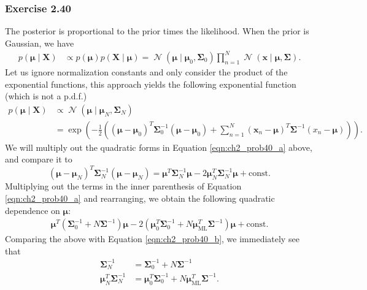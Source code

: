 \documentclass[12pt, a4paper]{article}
\newcommand{\vect}[1]{\bm{#1}}
\DeclareMathOperator{\N}{\mathcal{N}}
\begin{document}
\subsubsection*{Exercise 2.40}
The posterior is proportional to the prior times the likelihood.
When the prior is Gaussian, we have
\begin{align*}
	p( \vect{\mu} \mid \vect{X} ) &\propto p(\vect{\mu}) p (\vect{X} \mid \vect{\mu}) 
	= \N \left( \vect{\mu} \mid \vect{\mu}_0, \vect{\Sigma}_0 \right)
	\prod_{n=1}^{N}
	\N \left( \vect{x} \mid \vect{\mu}, \vect{\Sigma} \right).
\end{align*}
Let us ignore normalization constants and only consider the product of the exponential functions, this approach yields the following exponential function (which is not a p.d.f.)
\begin{align}
	\nonumber p( \vect{\mu} \mid \vect{X} ) & \propto \N \left( \vect{\mu} \mid \vect{\mu}_N, \vect{\Sigma}_N \right) \\
	\label{eqn:ch2_prob40_a} &= \exp\left( - \frac{1}{2} \left( 
	(\vect{\mu} - \vect{\mu}_0)^T \vect{\Sigma}_0^{-1} (\vect{\mu} - \vect{\mu}_0)
	+
	\sum_{n=1}^{N} (\vect{x}_n - \vect{\mu})^T \vect{\Sigma}^{-1} (x_n - \vect{\mu})
	 \right) \right).
\end{align}
We will multiply out the quadratic forms in Equation \eqref{eqn:ch2_prob40_a} above, and compare it to
\begin{equation}
\label{eqn:ch2_prob40_b}
	(\vect{\mu} - \vect{\mu}_N)^T \vect{\Sigma}_N^{-1} (\vect{\mu} - \vect{\mu}_N)
	= \vect{\mu}^T \vect{\Sigma}_N^{-1} \vect{\mu} - 2 \vect{\mu}_N^T \vect{\Sigma}_N^{-1} \vect{\mu} + \text{const}.
\end{equation}
Multiplying out the terms in the inner parenthesis of Equation \eqref{eqn:ch2_prob40_a} and rearranging, we obtain the following quadratic dependence on $\vect{\mu}$:
\begin{align*}
	\vect{\mu}^T \left( \vect{\Sigma}_0^{-1} + N \vect{\Sigma}^{-1} \right) \vect{\mu} - 2 
	\left( \vect{\mu}_0^T \vect{\Sigma}_0^{-1} + N \vect{\mu}_{\text{ML}}^T  \vect{\Sigma}^{-1} \right) \vect{\mu} + \text{const}.
\end{align*}
Comparing the above with Equation \eqref{eqn:ch2_prob40_b}, we immediately see that
\begin{align}
\label{eqn:ch2_prob40_c}
	\vect{\Sigma}_N^{-1} &= \vect{\Sigma}_0^{-1} + N \vect{\Sigma}^{-1} 
	\\
	\label{eqn:ch2_prob40_d}
	 \vect{\mu}_N^T \vect{\Sigma}_N^{-1} &=  \vect{\mu}_0^T \vect{\Sigma}_0^{-1} + N \vect{\mu}_{\text{ML}}^T  \vect{\Sigma}^{-1}.
\end{align}
\end{document}
